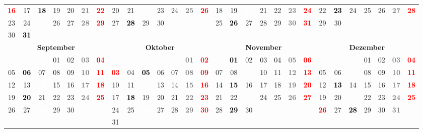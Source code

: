 \documentclass[10pt,a4paper,landscape]{article}
\newcommand{\yb}[1]{\cellcolor{yellow}\textcolor{black}{\bf #1}}
\newcommand{\iv}[1]{\cellcolor{black}\textcolor{white}{\bf #1}}
\newcommand{\rb}[1]{\textbf{\textcolor{red}{#1}}}
\newcommand{\hv}[1]{\textbf{\textcolor{Gray}{#1}}}
\begin{document}
\begin{tabular}{|ccccccc|ccccccc|ccccccc|ccccccc|}
\rb{16} & 17 & \yb{18} & 19 & 20 & \hv{21} & \rb{22} & 20 & 21 & \iv{22} & 23 & 24 & \hv{25} & \rb{26} & 18 & 19 & \iv{20} & 21 & 22 & \hv{23} & \rb{24} & 22 & \yb{23} & 24 & 25 & 26 & \hv{27} & \rb{28} \\
23 & 24 & \iv{25} & 26 & 27 & \hv{28} & \rb{29} & 27 & \yb{28} & 29 & 30 & & & & 25 & \yb{26} & 27 & 28 & 29 & \hv{30} & \rb{31} & 29 & 30 & \iv{31} & & & &  \\
30 & \yb{31} & & & & & & & & & & & & & & & & & & & & & & & & & &  \\
\hline
\multicolumn{7}{|c|}{\bf September} & \multicolumn{7}{|c|}{\bf Oktober} & \multicolumn{7}{|c|}{\bf November} & \multicolumn{7}{|c|}{\bf Dezember} \\
& & & 01 & 02 & \hv{03} & \rb{04} & & & & & & \hv{01} & \rb{02} & & \yb{01} & 02 & 03 & 04 & \hv{05} & \rb{06} & & & & 01 & 02 & \hv{03} & \rb{04} \\
05 & \yb{06} & 07 & 08 & 09 & \hv{10} & \rb{11} & \rb{03} & 04 & \yb{05} & 06 & 07 & \hv{08} & \rb{09} & 07 & 08 & \iv{09} & 10 & 11 & \hv{12} & \rb{13} & 05 & 06 & \iv{07} & 08 & 09 & \hv{10} & \rb{11} \\
12 & 13 & \iv{14} & 15 & 16 & \hv{17} & \rb{18} & 10 & 11 & \iv{12} & 13 & 14 & \hv{15} & \rb{16} & 14 & \yb{15} & 16 & 17 & 18 & \hv{19} & \rb{20} & 12 & \yb{13} & 14 & 15 & 16 & \hv{17} & \rb{18} \\
19 & \yb{20} & 21 & 22 & 23 & \hv{24} & \rb{25} & 17 & \yb{18} & 19 & 20 & 21 & \hv{22} & \rb{23} & 21 & 22 & \iv{23} & 24 & 25 & \hv{26} & \rb{27} & 19 & 20 & \iv{21} & 22 & 23 & \hv{24} & \rb{25} \\
26 & 27 & \iv{28} & 29 & 30 & & & 24 & 25 & \iv{26} & 27 & 28 & \hv{29} & \rb{30} & 28 & \yb{29} & 30 & & & & & \rb{26} & 27 & \yb{28} & 29 & 30 & \hv{31} &  \\
& & & & & & & 31 & & & & & & & & & & & & & & & & & & & &  \\
\hline
\end{tabular}
\end{document}

